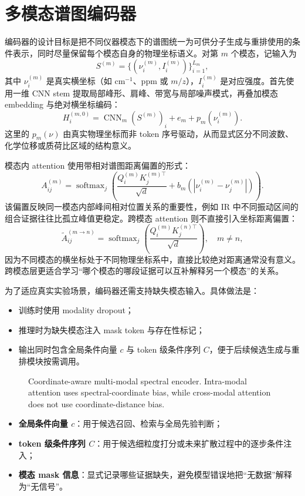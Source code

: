 \section{多模态谱图编码器}
编码器的设计目标是把不同仪器模态下的谱图统一为可供分子生成与重排使用的条件表示，同时尽量保留每个模态自身的物理坐标语义。对第 $m$ 个模态，记输入为
\[
S^{(m)} = \{(\nu_i^{(m)}, I_i^{(m)})\}_{i=1}^{L_m},
\]
其中 $\nu_i^{(m)}$ 是真实横坐标（如 cm$^{-1}$、ppm 或 $m/z$），$I_i^{(m)}$ 是对应强度。首先使用一维 CNN stem 提取局部峰形、肩峰、带宽与局部噪声模式，再叠加模态 embedding 与绝对横坐标编码：
\[
H_i^{(m,0)} = \operatorname{CNN}_m(S^{(m)})_i + e_m + p_m(\nu_i^{(m)}).
\]
这里的 $p_m(\nu)$ 由真实物理坐标而非 token 序号驱动，从而显式区分不同波数、化学位移或质荷比区域的结构意义。

模态内 attention 使用带相对谱图距离偏置的形式：
\[
A_{ij}^{(m)} = \operatorname{softmax}_j\left(\frac{Q_i^{(m)}K_j^{(m)\top}}{\sqrt{d}} + b_m\left(|\nu_i^{(m)}-\nu_j^{(m)}|\right)\right).
\]
该偏置反映同一模态内部峰间相对位置关系的重要性，例如 IR 中不同振动区间的组合证据往往比孤立峰值更稳定。跨模态 attention 则不直接引入坐标距离偏置：
\[
\widetilde{A}_{ij}^{(m\rightarrow n)} = \operatorname{softmax}_j\left(\frac{Q_i^{(m)}K_j^{(n)\top}}{\sqrt{d}}\right), \quad m \neq n,
\]
因为不同模态的横坐标处于不同物理坐标系中，直接比较绝对距离通常没有意义。跨模态层更适合学习“哪个模态的哪段证据可以互补解释另一个模态”的关系。

为了适应真实实验场景，编码器还需支持缺失模态输入。具体做法是：
\begin{itemize}
  \item 训练时使用 modality dropout；
  \item 推理时为缺失模态注入 mask token 与存在性标记；
  \item 输出同时包含全局条件向量 $c$ 与 token 级条件序列 $C$，便于后续候选生成与重排模块按需调用。
\end{itemize}

\begin{figure}[htbp]
  \centering
  
  \caption{Coordinate-aware multi-modal spectral encoder. Intra-modal attention uses spectral-coordinate bias, while cross-modal attention does not use coordinate-distance bias.}
\end{figure}

\begin{keybox}[编码器输出]
\begin{itemize}
  \item \textbf{全局条件向量 $c$}：用于候选召回、检索与全局先验判断；
  \item \textbf{token 级条件序列 $C$}：用于候选细粒度打分或未来扩散过程中的逐步条件注入；
  \item \textbf{模态 mask 信息}：显式记录哪些证据缺失，避免模型错误地把“无数据”解释为“无信号”。
\end{itemize}
\end{keybox}
